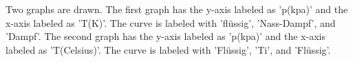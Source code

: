 Two graphs are drawn. The first graph has the y-axis labeled as 'p(kpa)' and the x-axis labeled as 'T(K)'. The curve is labeled with 'flüssig', 'Nass-Dampf', and 'Dampf'. The second graph has the y-axis labeled as 'p(kpa)' and the x-axis labeled as 'T(Celsius)'. The curve is labeled with 'Flüssig', 'Ti', and 'Flüssig'.
